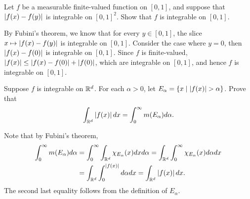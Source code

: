 \begin{exercise}
    Let $f$ be a measurable finite-valued function on $[0,1]$, and 
    suppose that $\left\lvert {f(x)-f(y)} \right\rvert$ is integrable on $[0,1]^2$. Show 
    that $f$ is integrable on $[0,1]$.
\end{exercise}
\begin{pf}
    By Fubini's theorem, we know that for every $y\in[0,1]$, 
    the slice $x\mapsto\left\lvert {f(x)-f(y)} \right\rvert$ is integrable on $[0,1]$. 
    Consider the case where $y=0$, then $\left\lvert {f(x)-f(0)} \right\rvert$ is 
    integrable on $[0,1]$. Since $f$ is finite-valued, 
    $\left\lvert {f(x)} \right\rvert\leq \left\lvert {f(x)-f(0)} \right\rvert+\left\lvert {f(0)} \right\rvert$, which are 
    integrable on $[0,1]$, and hence $f$ is integrable on 
    $[0,1]$.
\end{pf}

\begin{exercise}
    Suppose $f$ is integrable on $\mathbb{R}^d$. For each $\alpha>0$, 
    let $E_\alpha = \left\{ x \;\middle\vert\; \left\lvert {f(x)} \right\rvert>\alpha \right\}$. Prove that 
    \begin{equation*}
        \int_{\mathbb{R}^d} \left\lvert {f(x)} \right\rvert dx = \int_{0}^{\infty} m(E_\alpha)d\alpha.
    \end{equation*}
\end{exercise}
\begin{pf}
    Note that by Fubini's theorem,
    \begin{equation*}
        \begin{split}
            \int_{0}^{\infty} m(E_\alpha)d\alpha 
            &= \int_{0}^{\infty} \int_{\mathbb{R}^d} \chi_{E_\alpha}(x)dxd\alpha 
            = \int_{\mathbb{R}^d} \int_{0}^{\infty} \chi_{E_\alpha}(x)d\alpha dx \\
            &= \int_{\mathbb{R}^d} \int_{0}^{\left\lvert {f(x)} \right\rvert}d\alpha dx 
            = \int_{\mathbb{R}^d} \left\lvert {f(x)} \right\rvert dx.
        \end{split}
    \end{equation*}
    The second last equality follows from the definition of $E_\alpha$.
\end{pf}


